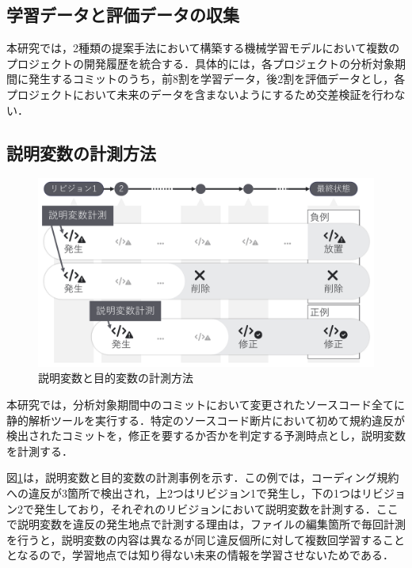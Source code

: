 \documentclass[T,J]{fose} %
\begin{document}
\subsection{学習データと評価データの収集}

本研究では，2種類の提案手法において構築する機械学習モデルにおいて複数のプロジェクトの開発履歴を統合する．具体的には，各プロジェクトの分析対象期間に発生するコミットのうち，前8割を学習データ，後2割を評価データとし，各プロジェクトにおいて未来のデータを含まないようにするため交差検証を行わない．



\subsection{説明変数の計測方法}

\begin{figure}[t]
	\centering
	\includegraphics[width=1.0\linewidth]{Kameoka_fig/kameoka_fig2_bw.pdf}
	\caption{説明変数と目的変数の計測方法}
	\label{fig:mokutekihensu}
\end{figure}

本研究では，分析対象期間中のコミットにおいて変更されたソースコード全てに静的解析ツールを実行する．特定のソースコード断片において初めて規約違反が検出されたコミットを，修正を要するか否かを判定する予測時点とし，説明変数を計測する．

図\ref{fig:mokutekihensu}は，説明変数と目的変数の計測事例を示す．この例では，コーディング規約への違反が3箇所で検出され，上2つはリビジョン1で発生し，下の1つはリビジョン2で発生しており，それぞれのリビジョンにおいて説明変数を計測する．ここで説明変数を違反の発生地点で計測する理由は，ファイルの編集箇所で毎回計測を行うと，説明変数の内容は異なるが同じ違反個所に対して複数回学習することとなるので，学習地点では知り得ない未来の情報を学習させないためである．
\end{document}
